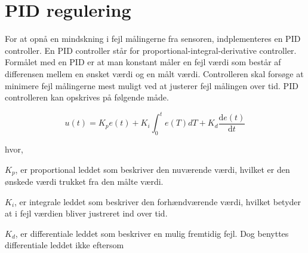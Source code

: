 \section{PID regulering}
For at opnå en mindskning i fejl målingerne fra sensoren, indplementeres en PID controller. En PID controller står for proportional-integral-derivative controller. Formålet med en PID er at man konstant måler en fejl værdi som består af differensen mellem en ønsket værdi og en målt værdi. Controlleren skal forsøge at minimere fejl målingerne mest muligt ved at justerer fejl målingen over tid.\newline
\newline
PID controlleren kan opskrives på følgende måde.

\begin{equation} 
u(t) = K_p e(t) + K_i\int_{0}^{t}e(T)dT + K_d\frac{\mathrm{d} e(t)}{\mathrm{d} t}
\end{equation}

hvor, 

$K_{p}$, er proportional leddet som beskriver den nuværende værdi, hvilket er den ønskede værdi trukket fra den målte værdi. 

$K_{i}$, er integrale leddet som beskriver den forhændværende værdi, hvilket betyder at i fejl værdien bliver justreret ind over tid.   

$K_{d}$, er differentiale leddet som beskriver en mulig fremtidig fejl. Dog benyttes differentiale leddet ikke eftersom 